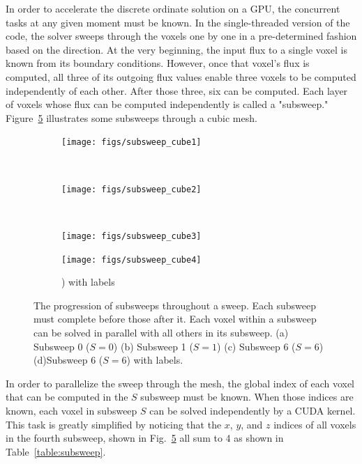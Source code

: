 In order to accelerate the discrete ordinate solution on a GPU, the concurrent tasks at any given moment must be known. In the single-threaded version of the code, the solver sweeps through the voxels one by one in a pre-determined fashion based on the direction. At the very beginning, the input flux to a single voxel is known from its boundary conditions. However, once that voxel's flux is computed, all three of its outgoing flux values enable three voxels to be computed independently of each other. After those three, six can be computed. Each layer of voxels whose flux can be computed independently is called a "subsweep." Figure~\ref{fig:subsweep_cube} illustrates some subsweeps through a cubic mesh.

\begin{figure}
    \centering
    \begin{subfigure}[b]{0.45\textwidth}
        \texttt{[image: figs/subsweep\_cube1]}
        \caption{}
        \label{fig:subsweep_cube1}
    \end{subfigure}
    ~ 
    \begin{subfigure}[b]{0.45\textwidth}
        \texttt{[image: figs/subsweep\_cube2]}
        \caption{}
        \label{fig:subsweep_cube2}
    \end{subfigure}
    ~ 
    \begin{subfigure}[b]{0.45\textwidth}
        \texttt{[image: figs/subsweep\_cube3]}
        \caption{}
        \label{fig:subsweep_cube3}
    \end{subfigure}
    \begin{subfigure}[b]{0.45\textwidth}
        \texttt{[image: figs/subsweep\_cube4]}
        \caption{) with labels}
        \label{fig:subsweep_cube4}
    \end{subfigure}
    \caption{The progression of subsweeps throughout a sweep. Each subsweep must complete before those after it. Each voxel within a subsweep can be solved in parallel with all others in its subsweep. (a) Subsweep 0 ($S=0$) (b) Subsweep 1 ($S=1$) (c) Subsweep 6 ($S=6$) (d)Subsweep 6 ($S=6$) with labels.}\label{fig:subsweep_cube}
\end{figure}

In order to parallelize the sweep through the mesh, the global index of each voxel that can be computed in the $S$ subsweep must be known. When those indices are known, each voxel in subsweep $S$ can be solved independently by a CUDA kernel. This task is greatly simplified by noticing that the $x$, $y$, and $z$ indices of all voxels in the fourth subsweep, shown in Fig.~\ref{fig:subsweep_cube} all sum to 4 as shown in Table~\ref{table:subsweep}.

